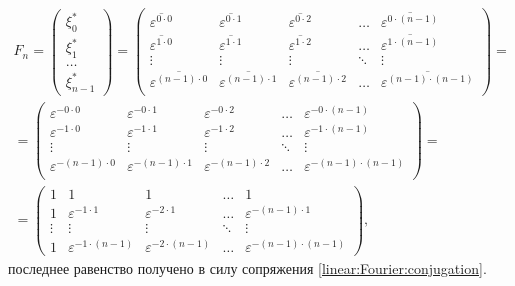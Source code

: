 \begin{multline*}
    F_n =
    \begin{pmatrix}
        \xi_0^* \\
        \xi_1^* \\
        \dots   \\
        \xi_{n-1}^*
    \end{pmatrix}
    =
    \begin{pmatrix}
        \overline{\varepsilon^{0 \cdot 0}}     & \overline{\varepsilon^{0 \cdot 1}}     & \overline{\varepsilon^{0 \cdot 2}}     & \dots  & \overline{\varepsilon^{0 \cdot (n-1)}} \\
        \overline{\varepsilon^{1 \cdot 0}}     & \overline{\varepsilon^{1 \cdot 1}}     & \overline{\varepsilon^{1 \cdot 2}}     & \dots  & \overline{\varepsilon^{1 \cdot (n-1)}} \\
        \vdots                                 & \vdots                                 & \vdots                                 & \ddots & \vdots                                     \\
        \overline{\varepsilon^{(n-1) \cdot 0}} & \overline{\varepsilon^{(n-1) \cdot 1}} & \overline{\varepsilon^{(n-1) \cdot 2}} & \dots  & \overline{\varepsilon^{(n-1) \cdot (n-1)}} \\
    \end{pmatrix} = \\
    = \begin{pmatrix}
          \varepsilon^{- 0 \cdot 0}     & \varepsilon^{- 0 \cdot 1}     & \varepsilon^{- 0 \cdot 2}     & \dots  & \varepsilon^{- 0 \cdot (n-1)}     \\
          \varepsilon^{- 1 \cdot 0}     & \varepsilon^{- 1 \cdot 1}     & \varepsilon^{- 1 \cdot 2}     & \dots  & \varepsilon^{- 1 \cdot (n-1)}     \\
          \vdots                        & \vdots                        & \vdots                        & \ddots & \vdots                            \\
          \varepsilon^{- (n-1) \cdot 0} & \varepsilon^{- (n-1) \cdot 1} & \varepsilon^{- (n-1) \cdot 2} & \dots  & \varepsilon^{- (n-1) \cdot (n-1)} \\
    \end{pmatrix} = \\
    = \begin{pmatrix}
          1      & 1                             & 1                             & \dots  & 1                                 \\
          1      & \varepsilon^{- 1 \cdot 1}     & \varepsilon^{- 2 \cdot 1}     & \dots  & \varepsilon^{- (n-1) \cdot 1}     \\
          \vdots & \vdots                        & \vdots                        & \ddots & \vdots                            \\
          1      & \varepsilon^{- 1 \cdot (n-1)} & \varepsilon^{- 2 \cdot (n-1)} & \dots  & \varepsilon^{- (n-1) \cdot (n-1)}
    \end{pmatrix}
    ,
\end{multline*}
последнее равенство получено в силу сопряжения \eqref{linear:Fourier:conjugation}.


